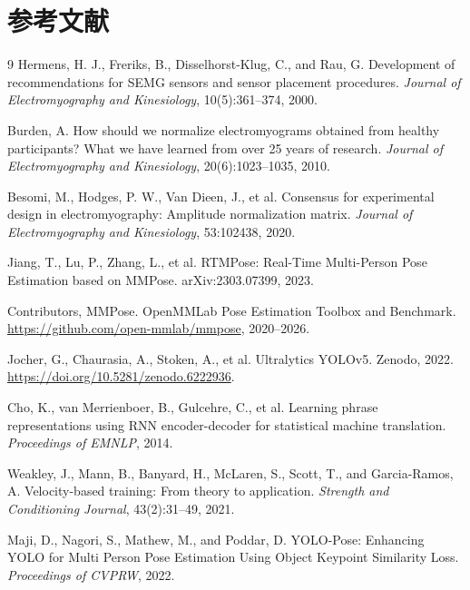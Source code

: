 \documentclass[UTF8,a4paper,12pt]{ctexart}
\begin{document}
\section*{参考文献}

\begin{thebibliography}{9}
Hermens, H. J., Freriks, B., Disselhorst-Klug, C., and Rau, G.
\newblock Development of recommendations for SEMG sensors and sensor placement
procedures.
\newblock \emph{Journal of Electromyography and Kinesiology}, 10(5):361--374,
2000.

Burden, A.
\newblock How should we normalize electromyograms obtained from healthy
participants? What we have learned from over 25 years of research.
\newblock \emph{Journal of Electromyography and Kinesiology}, 20(6):1023--1035,
2010.

Besomi, M., Hodges, P. W., Van Dieen, J., et al.
\newblock Consensus for experimental design in electromyography: Amplitude
normalization matrix.
\newblock \emph{Journal of Electromyography and Kinesiology}, 53:102438, 2020.

Jiang, T., Lu, P., Zhang, L., et al.
\newblock RTMPose: Real-Time Multi-Person Pose Estimation based on MMPose.
\newblock arXiv:2303.07399, 2023.

Contributors, MMPose.
\newblock OpenMMLab Pose Estimation Toolbox and Benchmark.
\newblock \url{https://github.com/open-mmlab/mmpose}, 2020--2026.

Jocher, G., Chaurasia, A., Stoken, A., et al.
\newblock Ultralytics YOLOv5.
\newblock Zenodo, 2022. \url{https://doi.org/10.5281/zenodo.6222936}.

Cho, K., van Merrienboer, B., Gulcehre, C., et al.
\newblock Learning phrase representations using RNN encoder-decoder for
statistical machine translation.
\newblock \emph{Proceedings of EMNLP}, 2014.

Weakley, J., Mann, B., Banyard, H., McLaren, S., Scott, T., and Garcia-Ramos, A.
\newblock Velocity-based training: From theory to application.
\newblock \emph{Strength and Conditioning Journal}, 43(2):31--49, 2021.

Maji, D., Nagori, S., Mathew, M., and Poddar, D.
\newblock YOLO-Pose: Enhancing YOLO for Multi Person Pose Estimation Using
Object Keypoint Similarity Loss.
\newblock \emph{Proceedings of CVPRW}, 2022.


\end{thebibliography}
\end{document}
